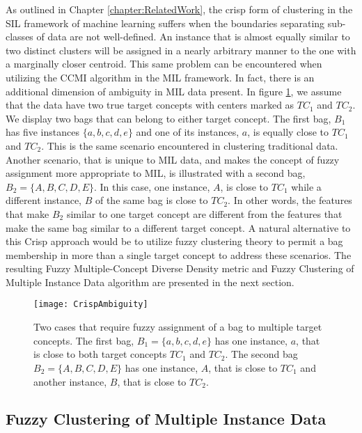 \documentclass[12pt,dvips]{report}
\numberwithin{equation}{section}
\begin{document}
As outlined in Chapter \ref{chapter:RelatedWork}, the crisp form of clustering in the SIL framework of machine learning suffers when the boundaries separating sub-classes of data are not well-defined.  An instance that is almost equally similar to two distinct clusters will be assigned in a nearly arbitrary manner to the one with a marginally closer centroid.  This same problem can be encountered when utilizing the CCMI algorithm in the MIL framework.  In fact, there is an additional dimension of  ambiguity in MIL data present.  In figure \ref{fig:IllustrateFuzzy}, we assume that the data have two true target concepts with centers marked as $TC_1$ and $TC_2$. We display two bags that can belong to either target concept. The first bag, $B_1$ has five instances $\{a, b, c, d, e\}$ and one of its instances, $a$, is equally close to  $TC_1$ and $TC_2$. This is the same scenario encountered in clustering traditional data. Another scenario, that is unique to MIL data, and makes the concept of fuzzy assignment more appropriate to MIL, is illustrated with a second bag, $B_2=\{A, B, C, D, E\}$. In this case, one instance, $A$, is close to $TC_1$ while a different instance, $B$ of the same bag is close to $TC_2$. In other words, the features that make $B_2$ similar to one target concept are different from the features that make the same bag similar to a different target concept.
A natural alternative to this Crisp approach would be to utilize fuzzy clustering theory to permit a bag membership in more than a single target concept to address these scenarios.  The resulting Fuzzy Multiple-Concept Diverse Density metric and Fuzzy Clustering of Multiple Instance Data algorithm are presented in the next section.

\begin{figure}[htb] 
  \centering
  \centerline{\texttt{[image: CrispAmbiguity]}}
  \caption{Two cases that require fuzzy assignment of a bag to multiple target concepts. The first bag, $B_1=\{a, b, c, d, e \}$ has one instance, $a$, that is close to both target concepts $TC_1$ and $TC_2$. The second bag $B_2=\{A, B, C, D, E\}$ has one instance, $A$, that is close to $TC_1$ and another instance, ${B}$, that is close to $TC_2$.    }
  \label{fig:IllustrateFuzzy}
\end{figure}
   
\subsection{Fuzzy Clustering of Multiple Instance Data} \label{subsec:FCMI}
\end{document}
